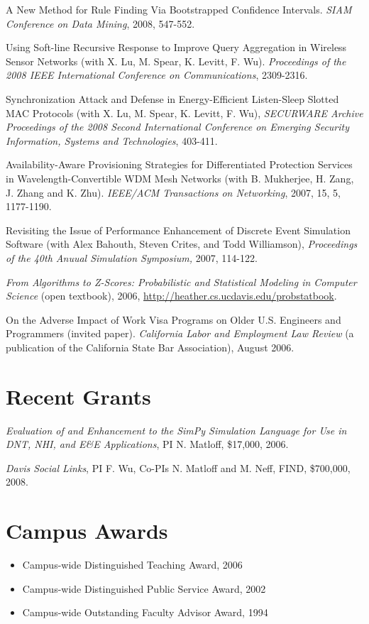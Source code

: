 \documentclass[11pt]{article}
\begin{document}
A New Method for Rule Finding Via Bootstrapped Confidence Intervals.
{\it SIAM Conference on Data Mining}, 2008, 547-552.

Using Soft-line Recursive Response to Improve Query Aggregation in
Wireless Sensor Networks (with X. Lu, M. Spear, K. Levitt, F. Wu).  {\it
Proceedings of the 2008 IEEE International Conference on
Communications}, 2309-2316.

Synchronization Attack and Defense in Energy-Efficient Listen-Sleep
Slotted MAC Protocols (with X. Lu, M. Spear, K. Levitt, F. Wu),  {\it
SECURWARE Archive Proceedings of the 2008 Second International
Conference on Emerging Security Information, Systems and Technologies},
403-411.

Availability-Aware Provisioning Strategies for Differentiated Protection
Services in Wavelength-Convertible WDM Mesh Networks (with B. Mukherjee,
H. Zang, J. Zhang and K. Zhu). {\it IEEE/ACM Transactions on Networking},
2007, 15, 5, 1177-1190.

Revisiting the Issue of Performance Enhancement of Discrete Event
Simulation Software (with Alex Bahouth, Steven Crites, and Todd
Williamson), {\it Proceedings of the 40th Anuual Simulation Symposium,}
2007, 114-122.

{\it From Algorithms to Z-Scores: Probabilistic and Statistical Modeling
in Computer Science} (open textbook), 2006,
\url{http://heather.cs.ucdavis.edu/probstatbook}.

On the Adverse Impact of Work Visa Programs on Older U.S. Engineers and
Programmers (invited paper).  {\it California Labor and Employment Law
Review} (a publication of the California State Bar Association), August
2006.

\section*{Recent Grants}

{\it Evaluation of and Enhancement to the SimPy Simulation Language for
Use in DNT, NHI, and E\&E Applications}, PI N. Matloff, \$17,000, 2006.

{\it Davis Social Links}, PI F. Wu, Co-PIs N. Matloff and M. Neff, FIND,
\$700,000, 2008.

\section*{Campus Awards}

\begin{itemize}

\item Campus-wide Distinguished Teaching Award, 2006

\item 
Campus-wide Distinguished Public Service Award, 2002

\item 
Campus-wide Outstanding Faculty Advisor Award, 1994

\end{itemize}
\end{document}
